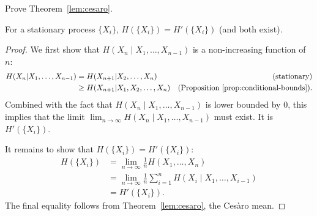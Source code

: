 \begin{exercise}
Prove Theorem~\ref{lem:cesaro}.
\end{exercise}

\begin{theorem}
For a stationary process $\{X_i\}$, $H(\{X_i\}) = H'(\{X_i\})$ (and both exist).
\end{theorem}
\begin{proof}
We first show that $H(X_n \mid X_1, \dots, X_{n-1})$ is a non-increasing function of $n$:
\begin{align}
H(X_{n}|X_1, \dots, X_{n-1}) &= H(X_{n+1}|X_2, \dots, X_{n})\nonumber &\text{(stationary)}\\
&\geq H(X_{n+1}|X_1, X_2, \ldots, X_{n}) &\text{(Proposition~\ref{prop:conditional-bounds})}.
\end{align}
Combined with the fact that $H(X_n \mid X_1, \dots, X_{n-1})$ is lower bounded by 0, this implies that the limit $\lim_{n \to \infty} H(X_n \mid X_1, \dots, X_{n-1})$ must exist. It is $H'(\{X_i\})$.

It remains to show that $H(\{X_i\}) = H'(\{X_i\})$:
\begin{align}
H(\{X_i\}) &= \lim_{n \to \infty} \frac{1}{n} H(X_1, \dots, X_n)\nonumber\\
&= \lim_{n \to \infty} \frac{1}{n} \sum_{i=1}^n H(X_i \mid X_1, \dots, X_{i-1})\nonumber\\
&= H'(\{X_i\}).
\end{align}
The final equality follows from Theorem~\ref{lem:cesaro}, the Ces\`{a}ro mean.

\end{proof}


